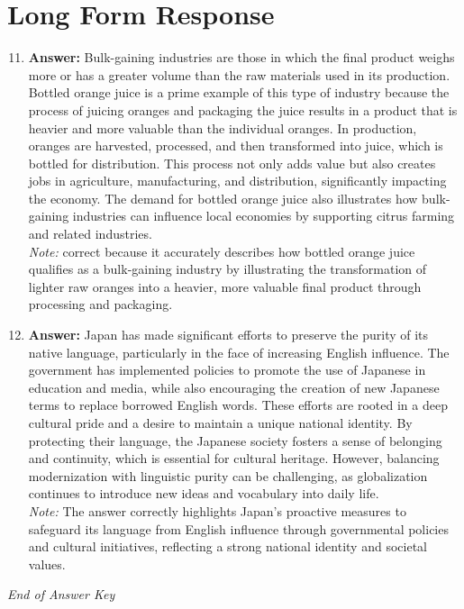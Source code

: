 \documentclass[12pt]{article}
\begin{document}
\section*{Long Form Response}
\begin{enumerate}[label=\arabic*.]
\setcounter{enumi}{10}
\item \textbf{Answer:} Bulk-gaining industries are those in which the final product weighs more or has a greater volume than the raw materials used in its production. Bottled orange juice is a prime example of this type of industry because the process of juicing oranges and packaging the juice results in a product that is heavier and more valuable than the individual oranges. In production, oranges are harvested, processed, and then transformed into juice, which is bottled for distribution. This process not only adds value but also creates jobs in agriculture, manufacturing, and distribution, significantly impacting the economy. The demand for bottled orange juice also illustrates how bulk-gaining industries can influence local economies by supporting citrus farming and related industries.
\\ \textit{Note:} correct because it accurately describes how bottled orange juice qualifies as a bulk-gaining industry by illustrating the transformation of lighter raw oranges into a heavier, more valuable final product through processing and packaging.
\item \textbf{Answer:} Japan has made significant efforts to preserve the purity of its native language, particularly in the face of increasing English influence. The government has implemented policies to promote the use of Japanese in education and media, while also encouraging the creation of new Japanese terms to replace borrowed English words. These efforts are rooted in a deep cultural pride and a desire to maintain a unique national identity. By protecting their language, the Japanese society fosters a sense of belonging and continuity, which is essential for cultural heritage. However, balancing modernization with linguistic purity can be challenging, as globalization continues to introduce new ideas and vocabulary into daily life.
\\ \textit{Note:} The answer correctly highlights Japan's proactive measures to safeguard its language from English influence through governmental policies and cultural initiatives, reflecting a strong national identity and societal values.
\end{enumerate}

\vfill
\noindent\textit{End of Answer Key}
\end{document}

